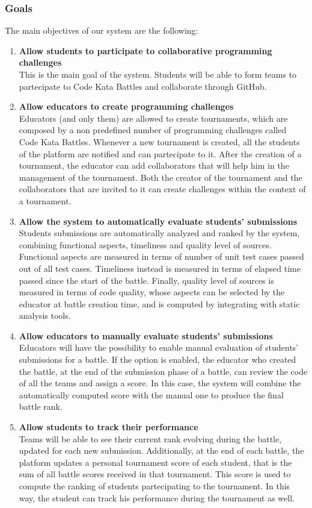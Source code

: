  \subsubsection{Goals}
 \label{goals}
 The main objectives of our system are the following:
 \begin{enumerate}[label=$\bullet$ \textbf{G\arabic*:}]
     \item \textbf{ Allow students to participate to collaborative programming challenges}\\This is the main goal of the system. Students will be able to form teams to partecipate to Code Kata Battles and collaborate through GitHub.
     \item \textbf{ Allow educators to create programming challenges}\\Educators (and only them) are allowed to create tournaments, which are composed by a non predefined number of programming challenges called Code Kata Battles. Whenever a new tournament is created, all the students of the platform are notified and can partecipate to it. After the creation of a tournament, the educator can add collaborators that will help him in the management of the tournament. Both the creator of the tournament and the collaborators that are invited to it can create challenges within the context of a tournament.
     \item \textbf{ Allow the system to automatically evaluate students' submissions}\\Students submissions are automatically analyzed and ranked by the system, combining functional aspects, timeliness and quality level of sources. Functional aspects are measured in terms of number of unit test cases passed out of all test cases. Timeliness instead is measured in terms of elapsed time passed since the start of the battle. Finally, quality level of sources is measured in terms of code quality, whose aspects can be selected by the educator at battle creation time, and is computed by integrating with static analysis tools.
     \item \textbf{ Allow educators to manually evaluate students' submissions}\\Educators will have the possibility to enable manual evaluation of students' submissions for a battle. If the option is enabled, the educator who created the battle, at the end of the submission phase of a battle, can review the code of all the teams and assign a score. In this case, the system will combine the automatically computed score with the manual one to produce the final battle rank.
     \item \textbf{ Allow students to track their performance}\\Teams will be able to see their current rank evolving during the battle, updated for each new submission. Additionally, at the end of each battle, the platform updates a personal tournament score of each student, that is the sum of all battle scores received in that tournament. This score is used to compute the ranking of students partecipating to the tournament. In this way, the student can track his performance during the tournament as well.
 \end{enumerate}
\newpage
